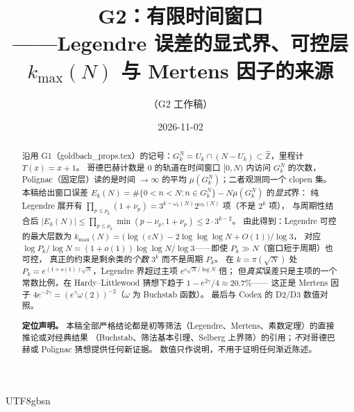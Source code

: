 \documentclass[11pt,a4paper]{article}
\newcommand{\Zhat}{\widehat{\mathbb Z}}
\newcommand{\Haar}{\mu}
\newcommand{\kmax}{k_{\max}}
\theoremstyle{plain}
\theoremstyle{definition}
\begin{document}
\begin{CJK}{UTF8}{gbsn}

\title{G2：有限时间窗口\\[2pt]
\large ——{}Legendre 误差的显式界、可控层 $\kmax(N)$ 与 Mertens 因子的来源}
\author{（G2 工作稿）}
\date{2026-11-02}
\maketitle

\begin{abstract}
沿用 G1（goldbach\_props.tex）的记号：$G_k^N=U_k\cap(N-U_k)\subset\Zhat$，里程计 $T(x)=x+1$。
哥德巴赫计数是 $0$ 的轨道在时间窗口 $[0,N)$ 内访问 $G_k^N$ 的次数，Polignac（固定层）读的是时间 $\to\infty$ 的平均
$\Haar(G_k^N)$；二者观测同一个 clopen 集。本稿给出窗口误差
$E_k(N)=\#\{0<n<N:n\in G_k^N\}-N\Haar(G_k^N)$ 的\emph{显式}界：
纯 Legendre 展开有 $\prod_{p\le p_k}(1+\nu_p)=3^{k-\omega_k(N)}2^{\omega_k(N)}$ 项（不是 $2^k$ 项），
与周期性结合后 $|E_k(N)|\le\prod_{p\le p_k}\min(p-\nu_p,1+\nu_p)\le2\cdot3^{k-2}$。
由此得到：Legendre 可控的最大层数为 $\kmax(N)=\bigl(\log(\varepsilon N)-2\log\log\log N+O(1)\bigr)/\log3$，
对应 $\log P_k/\log N=(1+o(1))\log\log N/\log3$——即使 $P_k\gg N$（窗口短于周期）也可控，
真正的约束是剩余类的\emph{个数} $3^k$ 而不是周期 $P_k$。
在 $k=\pi(\sqrt N)$ 处 $P_k=e^{(1+o(1))\sqrt N}$，Legendre 界超过主项 $e^{c\sqrt N/\log N}$ 倍；
但\emph{真实}误差只是主项的一个常数比例，在 Hardy--Littlewood 猜想下趋于 $1-e^{2\gamma}/4\approx20.7\%$——
这正是 Mertens 因子 $4e^{-2\gamma}=(e^\gamma\omega(2))^{-2}$（$\omega$ 为 Buchstab 函数）。
最后与 Codex 的 D2/D3 数值对照。

\textbf{定位声明。} 本稿全部严格结论都是初等筛法（Legendre、Mertens、素数定理）的直接推论或对经典结果
（Buchstab、筛法基本引理、Selberg 上界筛）的引用；\emph{不}对哥德巴赫或 Polignac 猜想提供任何新证据。
数值只作说明，不用于证明任何渐近陈述。
\end{abstract}


\end{CJK}
\end{document}
